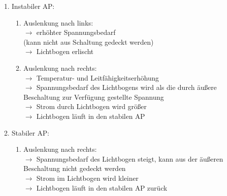 \documentclass[a4paper,twocolumn,10pt]{article}
\begin{document}
\begin{enumerate}[label=$\bullet$]
\item Instabiler AP:
\begin{enumerate}[label=-]
\item Auslenkung nach links:\\
$\rightarrow$ erhöhter Spannungsbedarf\\
(kann nicht aus Schaltung gedeckt werden)\\
$\rightarrow$ Lichtbogen erlischt
\item Auslenkung nach rechts:\\
$\rightarrow$ Temperatur- und Leitfähigkeitserhöhung\\
$\rightarrow$ Spannungsbedarf des Lichtbogens wird als die durch äußere Beschaltung zur Verfügung gestellte Spannung\\
$\rightarrow$ Strom durch Lichtbogen wird größer\\
$\rightarrow$ Lichtbogen läuft in den stabilen AP
\end{enumerate}
\item Stabiler AP:
\begin{enumerate}[label=-]
\item Auslenkung nach rechts:\\
$\rightarrow$ Spannungsbedarf des Lichtbogen steigt, kann aus der äußeren Beschaltung nicht gedeckt werden\\
$\rightarrow$ Strom im Lichtbogen wird kleiner\\
$\rightarrow$ Lichtbogen läuft in den stabilen AP zurück
\end{enumerate}
\end{enumerate}

\newpage
\end{document}
